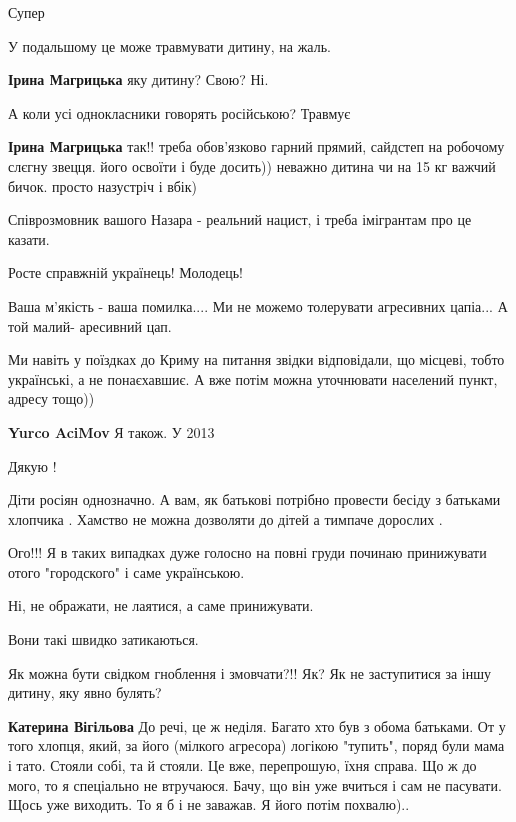 \begin{itemize}
Супер

У подальшому це може травмувати дитину, на жаль.

\begin{itemize} %
\textbf{Ірина Магрицька} яку дитину?
Свою?
Ні.

А коли усі однокласники говорять російською? Травмує

\textbf{Ірина Магрицька} так!! треба обов'язково гарний прямий, сайдстеп на робочому слєгну звецця. його освоїти і буде досить)) неважно дитина чи на 15 кг важчий бичок. просто назустріч і вбік)
\end{itemize} %

Співрозмовник вашого Назара - реальний нацист, і треба імігрантам про це казати.

Росте справжній українець! Молодець!

Ваша м'якість - ваша помилка....
Ми не можемо толерувати агресивних цапіа...
А той малий- аресивний цап.


Ми навіть у поїздках до Криму на питання звідки відповідали, що місцеві, тобто
українські, а не понаєхавшиє. А вже потім можна уточнювати населений пункт,
адресу тощо))

\begin{itemize} %
\textbf{Yurco AciMov} Я також. У 2013
\end{itemize} %

Дякую !


Діти росіян однозначно. А вам, як батькові потрібно провести бесіду з батьками
хлопчика . Хамство не можна дозволяти до дітей а тимпаче дорослих .



Ого!!! Я в таких випадках дуже голосно на повні груди починаю принижувати отого
"городского" і саме українською.

Ні, не ображати, не лаятися, а саме принижувати.

Вони такі швидко затикаються.

Як можна бути свідком гноблення і змовчати?!! Як? Як не заступитися за іншу
дитину, яку явно булять?

\begin{itemize} %
\textbf{Катерина Вігільова} До речі, це ж неділя. Багато хто був з обома батьками. От у того хлопця, який, за його (мілкого агресора) логікою "тупить", поряд були мама і тато. Стояли собі, та й стояли. Це вже, перепрошую, їхня справа. Що ж до мого, то я спеціально не втручаюся. Бачу, що він уже вчиться і сам не пасувати. Щось уже виходить. То я б і не заважав. Я його потім похвалю)..


\end{itemize}
\end{itemize}
